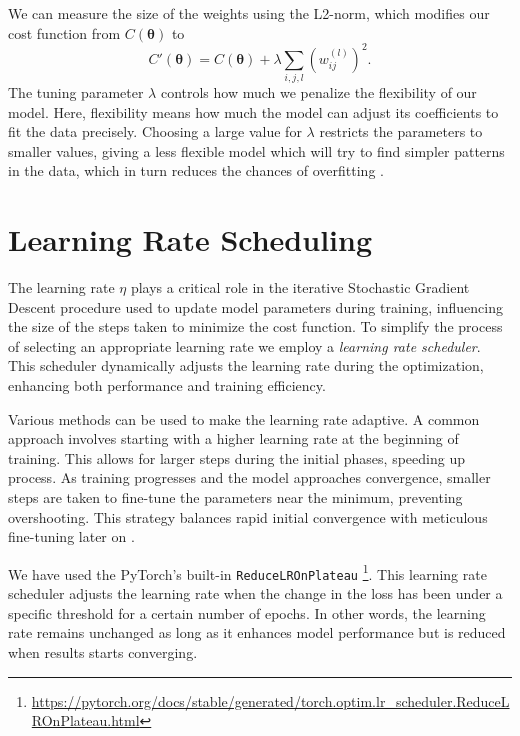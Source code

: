 \documentclass[a4paper, UKenglish, 11pt]{uiomaster}
\begin{document}
We can measure the size of the weights using the L2-norm, which modifies our cost function from
\(C(\boldsymbol \theta)\)
to
\begin{equation}
  C'(\boldsymbol \theta)
    = C(\boldsymbol \theta) + \lambda\sum_{i,j,l} \left( w_{ij}^{(l)} \right)^2.
  \label{eq:L2}
\end{equation}
The tuning parameter $\lambda$ controls how much we penalize the flexibility of our model. Here, flexibility means how much the model can adjust its coefficients to fit the data precisely. Choosing a large value for $\lambda$ restricts the parameters to smaller values, giving a less flexible model which will try to find simpler patterns in the data, which in turn reduces the chances of overfitting \cite{gupta2017regularization}.





\section{Learning Rate Scheduling}

The learning rate \(\eta\) plays a critical role in the iterative Stochastic Gradient Descent procedure used to update model parameters during training, influencing the size of the steps taken to minimize the cost function. To simplify the process of selecting an appropriate learning rate we employ a \emph{learning rate scheduler}. This scheduler dynamically adjusts the learning rate during the optimization, enhancing both performance and training efficiency.

Various methods can be used to make the learning rate adaptive. A common approach involves starting with a higher learning rate at the beginning of training. This allows for larger steps during the initial phases, speeding up process. As training progresses and the model approaches convergence, smaller steps are taken to fine-tune the parameters near the minimum, preventing overshooting. This strategy balances rapid initial convergence with meticulous fine-tuning later on \cite{pytorch_learning_rate_schedule}.

We have used the PyTorch's built-in \texttt{ReduceLROnPlateau} \footnote{\url{https://pytorch.org/docs/stable/generated/torch.optim.lr_scheduler.ReduceLROnPlateau.html}}. This learning rate scheduler adjusts the learning rate when the change in the loss has been under a specific threshold for a certain number of epochs. In other words, the learning rate remains unchanged as long as it enhances model performance but is reduced when results starts converging.
\end{document}
